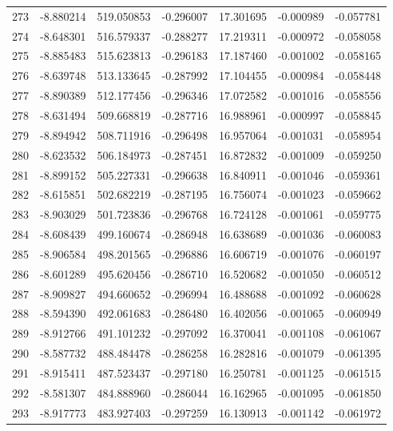 \begin{tabular}{rrrrrrr}
 273 &  -8.880214 &  519.050853 & -0.296007 &  17.301695 &  -0.000989 & -0.057781 \\
 274 &  -8.648301 &  516.579337 & -0.288277 &  17.219311 &  -0.000972 & -0.058058 \\
 275 &  -8.885483 &  515.623813 & -0.296183 &  17.187460 &  -0.001002 & -0.058165 \\
 276 &  -8.639748 &  513.133645 & -0.287992 &  17.104455 &  -0.000984 & -0.058448 \\
 277 &  -8.890389 &  512.177456 & -0.296346 &  17.072582 &  -0.001016 & -0.058556 \\
 278 &  -8.631494 &  509.668819 & -0.287716 &  16.988961 &  -0.000997 & -0.058845 \\
 279 &  -8.894942 &  508.711916 & -0.296498 &  16.957064 &  -0.001031 & -0.058954 \\
 280 &  -8.623532 &  506.184973 & -0.287451 &  16.872832 &  -0.001009 & -0.059250 \\
 281 &  -8.899152 &  505.227331 & -0.296638 &  16.840911 &  -0.001046 & -0.059361 \\
 282 &  -8.615851 &  502.682219 & -0.287195 &  16.756074 &  -0.001023 & -0.059662 \\
 283 &  -8.903029 &  501.723836 & -0.296768 &  16.724128 &  -0.001061 & -0.059775 \\
 284 &  -8.608439 &  499.160674 & -0.286948 &  16.638689 &  -0.001036 & -0.060083 \\
 285 &  -8.906584 &  498.201565 & -0.296886 &  16.606719 &  -0.001076 & -0.060197 \\
 286 &  -8.601289 &  495.620456 & -0.286710 &  16.520682 &  -0.001050 & -0.060512 \\
 287 &  -8.909827 &  494.660652 & -0.296994 &  16.488688 &  -0.001092 & -0.060628 \\
 288 &  -8.594390 &  492.061683 & -0.286480 &  16.402056 &  -0.001065 & -0.060949 \\
 289 &  -8.912766 &  491.101232 & -0.297092 &  16.370041 &  -0.001108 & -0.061067 \\
 290 &  -8.587732 &  488.484478 & -0.286258 &  16.282816 &  -0.001079 & -0.061395 \\
 291 &  -8.915411 &  487.523437 & -0.297180 &  16.250781 &  -0.001125 & -0.061515 \\
 292 &  -8.581307 &  484.888960 & -0.286044 &  16.162965 &  -0.001095 & -0.061850 \\
 293 &  -8.917773 &  483.927403 & -0.297259 &  16.130913 &  -0.001142 & -0.061972 \\

\end{tabular}

